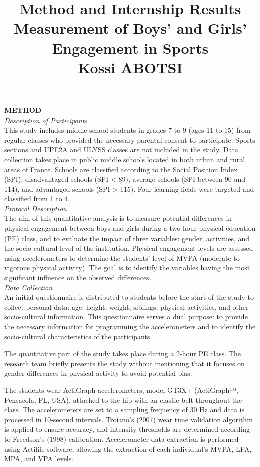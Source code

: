 \documentclass[12pt,a4paper]{article}
\title{
	\textbf{Method and Internship Results}\\[0.5cm]
	\textbf{Measurement of Boys' and Girls' Engagement in Sports}\\
	\vspace{2cm}
	\textbf{Kossi ABOTSI}\\
}
\begin{document}
	\maketitle
	\textbf{METHOD}\\
	
	\textit{Description of Participants}\\
	This study includes middle school students in grades 7 to 9 (ages 11 to 15) from regular classes who provided the necessary parental consent to participate. Sports sections and UPE2A and ULYSS classes are not included in the study. Data collection takes place in public middle schools located in both urban and rural areas of France. Schools are classified according to the Social Position Index (SPI): disadvantaged schools (SPI < 89), average schools (SPI between 90 and 114), and advantaged schools (SPI > 115). Four learning fields were targeted and classified from 1 to 4.\\
	
	\textit{Protocol Description}\\
	The aim of this quantitative analysis is to measure potential differences in physical engagement between boys and girls during a two-hour physical education (PE) class, and to evaluate the impact of three variables: gender, activities, and the socio-cultural level of the institution. Physical engagement levels are assessed using accelerometers to determine the students' level of MVPA (moderate to vigorous physical activity). The goal is to identify the variables having the most significant influence on the observed differences.\\
	
	\textit{Data Collection}\\
	An initial questionnaire is distributed to students before the start of the study to collect personal data: age, height, weight, siblings, physical activities, and other socio-cultural information. This questionnaire serves a dual purpose: to provide the necessary information for programming the accelerometers and to identify the socio-cultural characteristics of the participants.
	
	The quantitative part of the study takes place during a 2-hour PE class. The research team briefly presents the study without mentioning that it focuses on gender differences in physical activity to avoid potential bias.
	
	The students wear ActiGraph accelerometers, model GT3X+ (ActiGraph™, Pensacola, FL, USA), attached to the hip with an elastic belt throughout the class. The accelerometers are set to a sampling frequency of 30 Hz and data is processed in 10-second intervals. Troiano's (2007) wear time validation algorithm is applied to ensure accuracy, and intensity thresholds are determined according to Freedson's (1998) calibration. Accelerometer data extraction is performed using Actilife software, allowing the extraction of each individual's MVPA, LPA, MPA, and VPA levels.\\
	
\end{document}
